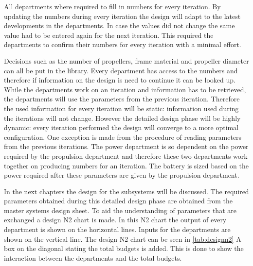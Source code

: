 All departments where required to fill in numbers for every iteration. By updating the numbers during every iteration the design will adapt to the latest developments in the departments. In case the values did not change the same value had to be entered again for the next iteration. This required the departments to confirm their numbers for every iteration with a minimal effort.

Decisions such as the number of propellers, frame material and propeller diameter can all be put in the library. Every department has access to the numbers and therefore if information on the design is need to continue it can be looked up. While the departments work on an iteration and information has to be retrieved, the departments will use the parameters from the previous iteration. Therefore the used information for every iteration will be static: information used during the iterations will not change. However the detailed design phase will be highly dynamic: every iteration performed the design will converge to a more optimal configuration. One exception is made from the procedure of reading parameters from the previous iterations. The power department is so dependent on the power required by the propulsion department and therefore these two departments work together on producing numbers for an iteration. The battery is sized based on the power required after these parameters are given by the propulsion department.

In the next chapters the design for the subsystems will be discussed. The required parameters obtained during this detailed design phase are obtained from the master systems design sheet. To aid the understanding of parameters that are exchanged a design N2 chart is made. In this N2 chart the output of every department is shown on the horizontal lines. Inputs for the departments are shown on the vertical line. The design N2 chart can be seen in \autoref{tab:designn2} A box on the diagonal stating the total budgets is added. This is done to show the interaction between the departments and the total budgets.

